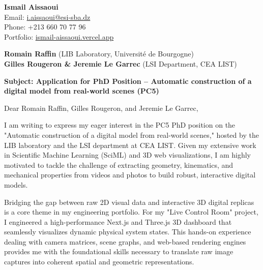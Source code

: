 \documentclass[11pt,a4paper]{article}
\begin{document}
\thispagestyle{empty}

\begin{flushright}
\textbf{Ismail Aissaoui} \\
Email: \href{mailto:i.aissaoui@esi-sba.dz}{i.aissaoui@esi-sba.dz} \\
Phone: +213 660 70 77 96 \\
Portfolio: \href{https://ismail-aissaoui.vercel.app}{ismail-aissaoui.vercel.app}
\end{flushright}

\vspace{1em}

\begin{flushleft}
\textbf{Romain Raffin} (LIB Laboratory, Université de Bourgogne) \\
\textbf{Gilles Rougeron \& Jeremie Le Garrec} (LSI Department, CEA LIST)
\end{flushleft}

\vspace{1em}
\noindent\textbf{Subject: Application for PhD Position -- Automatic construction of a digital model from real-world scenes (PC5)}
\vspace{1em}

\noindent Dear Romain Raffin, Gilles Rougeron, and Jeremie Le Garrec,

\vspace{1em}
\noindent
I am writing to express my eager interest in the PC5 PhD position on the "Automatic construction of a digital model from real-world scenes," hosted by the LIB laboratory and the LSI department at CEA LIST. Given my extensive work in Scientific Machine Learning (SciML) and 3D web visualizations, I am highly motivated to tackle the challenge of extracting geometry, kinematics, and mechanical properties from videos and photos to build robust, interactive digital models.

\vspace{0.5em}
\noindent
Bridging the gap between raw 2D visual data and interactive 3D digital replicas is a core theme in my engineering portfolio. For my "Live Control Room" project, I engineered a high-performance Next.js and Three.js 3D dashboard that seamlessly visualizes dynamic physical system states. This hands-on experience dealing with camera matrices, scene graphs, and web-based rendering engines provides me with the foundational skills necessary to translate raw image captures into coherent spatial and geometric representations. 
\end{document}
